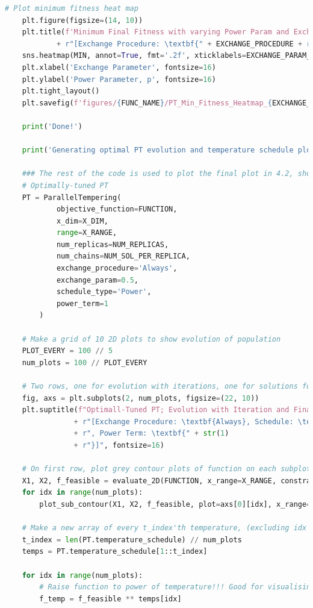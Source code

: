 \documentclass[10pt]{article}
\begin{document}
\begin{lstlisting}[language=Python, caption=PT\_TuningExperiments.py, label=PT_TuningExperimentspy]
    # Plot minimum fitness heat map
    plt.figure(figsize=(14, 10))
    plt.title(f'Minimum Final Fitness with varying Power Param and Exchange Param on {FUNC_NAME} Function \n' 
            + r"[Exchange Procedure: \textbf{" + EXCHANGE_PROCEDURE + r"}]", fontsize=18)
    sns.heatmap(MIN, annot=True, fmt='.2f', xticklabels=EXCHANGE_PARAM_LIST, yticklabels=PROGRESSION_POWER_LIST, cmap='Blues')
    plt.xlabel('Exchange Parameter', fontsize=16)
    plt.ylabel('Power Parameter, p', fontsize=16)
    plt.tight_layout()
    plt.savefig(f'figures/{FUNC_NAME}/PT_Min_Fitness_Heatmap_{EXCHANGE_PROCEDURE}.png')
    
    print('Done!')
    
    print('Generating optimal PT evolution and temperature schedule plot...')
    
    ### The rest of the code is used to plot the final plot in 4.2, showing the evolution of the solutions for the optimal PT ###
    # Optimally-tuned PT
    PT = ParallelTempering(
            objective_function=FUNCTION,
            x_dim=X_DIM,
            range=X_RANGE,
            num_replicas=NUM_REPLICAS,
            num_chains=NUM_SOL_PER_REPLICA,
            exchange_procedure='Always',
            exchange_param=0.5,
            schedule_type='Power',
            power_term=1
        )
    
    # Make a grid of 10 2D plots to show evolution of population
    PLOT_EVERY = 100 // 5
    num_plots = 100 // PLOT_EVERY
    
    # Two rows, one for evolution with iterations, one for solutions for each replica/temperature
    fig, axs = plt.subplots(2, num_plots, figsize=(22, 10))
    plt.suptitle(f"Optimall-Tuned PT; Evolution with Iteration and Final Solutions per Replica  \n"
                + r"[Exchange Procedure: \textbf{Always}, Schedule: \textbf{Uniform}"
                + r", Power Term: \textbf{" + str(1)
                + r"}]", fontsize=16)
    
    # On first row, plot grey contour plots of function on each subplot in grid
    X1, X2, f_feasible = evaluate_2D(FUNCTION, x_range=X_RANGE, constraints=True)
    for idx in range(num_plots):
        plot_sub_contour(X1, X2, f_feasible, plot=axs[0][idx], x_range=X_RANGE)
    
    # Make a new array of every t_index'th temperature, (excluding idx 0)
    t_index = len(PT.temperature_schedule) // num_plots
    temps = PT.temperature_schedule[1::t_index]
    
    for idx in range(num_plots):
        # Raise function to power of temperature!!! Good for visualising how the temperature affects the function
        f_temp = f_feasible ** temps[idx]
    

\end{lstlisting}
\end{document}
